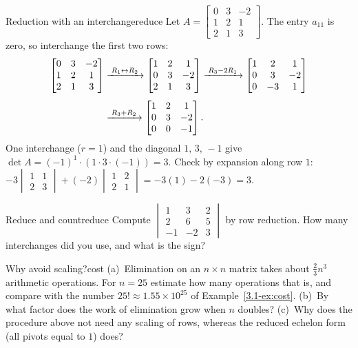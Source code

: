 \documentclass[11pt]{article}
\begin{document}
\begin{exmp}{Reduction with an interchange}{reduce}
Let $A=\begin{bmatrix}0&3&-2\\1&2&1\\2&1&3\end{bmatrix}$. The entry $a_{11}$ is zero, so interchange the first two rows:
\begin{align*}
\begin{bmatrix}0&3&-2\\1&2&1\\2&1&3\end{bmatrix}
&\xrightarrow{\;R_1\leftrightarrow R_2\;}
\begin{bmatrix}1&2&1\\0&3&-2\\2&1&3\end{bmatrix}
\xrightarrow{\;R_3-2R_1\;}
\begin{bmatrix}1&2&1\\0&3&-2\\0&-3&1\end{bmatrix}\\[4pt]
&\xrightarrow{\;R_3+R_2\;}
\begin{bmatrix}1&2&1\\0&3&-2\\0&0&-1\end{bmatrix}.
\end{align*}
One interchange ($r=1$) and the diagonal $1,\,3,\,-1$ give $\det A=(-1)^1\cdot(1\cdot3\cdot(-1))=3$. Check by expansion along row $1$: $-3\begin{vmatrix}1&1\\2&3\end{vmatrix}+(-2)\begin{vmatrix}1&2\\2&1\end{vmatrix}=-3(1)-2(-3)=3$.
\end{exmp}

\begin{kc}{Reduce and count}{reduce}
Compute $\begin{vmatrix}1&3&2\\2&6&5\\-1&-2&3\end{vmatrix}$ by row reduction. How many interchanges did you use, and what is the sign?
\end{kc}

\begin{think}{Why avoid scaling?}{cost}
(a)~Elimination on an $n\times n$ matrix takes about $\tfrac23n^3$ arithmetic operations. For $n=25$ estimate how many operations that is, and compare with the number $25!\approx1.55\times10^{25}$ of Example~\ref{3.1-ex:cost}. (b)~By what factor does the work of elimination grow when $n$ doubles? (c)~Why does the procedure above not need any scaling of rows, whereas the reduced echelon form (all pivots equal to $1$) does?
\end{think}
\end{document}
